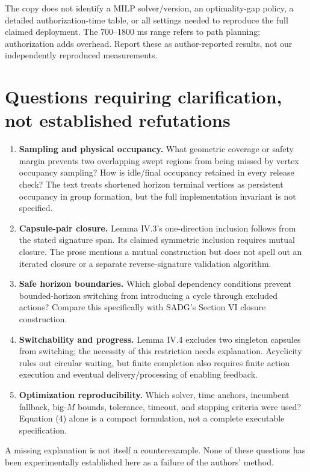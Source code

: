 \documentclass[11pt,a4paper]{article}
\begin{document}
The copy does not identify a MILP solver/version, an optimality-gap policy,
a detailed authorization-time table, or all settings needed to reproduce the
full claimed deployment. The 700--1800 ms range refers to path planning;
authorization adds overhead. Report these as author-reported results, not our
independently reproduced measurements.

\section{Questions requiring clarification, not established refutations}
\begin{enumerate}
\item \textbf{Sampling and physical occupancy.} What geometric coverage or safety
margin prevents two overlapping swept regions from being missed by vertex
occupancy sampling? How is idle/final occupancy retained in every release check?
The text treats shortened horizon terminal vertices as persistent occupancy in
group formation, but the full implementation invariant is not specified.
\item \textbf{Capsule-pair closure.} Lemma IV.3's one-direction inclusion follows
from the stated signature span. Its claimed symmetric inclusion requires mutual
closure. The prose mentions a mutual construction but does not spell out an
iterated closure or a separate reverse-signature validation algorithm.
\item \textbf{Safe horizon boundaries.} Which global dependency conditions prevent
bounded-horizon switching from introducing a cycle through excluded actions?
Compare this specifically with SADG's Section VI closure construction.
\item \textbf{Switchability and progress.} Lemma IV.4 excludes two singleton
capsules from switching; the necessity of this restriction needs explanation.
Acyclicity rules out circular waiting, but finite completion also requires finite
action execution and eventual delivery/processing of enabling feedback.
\item \textbf{Optimization reproducibility.} Which solver, time anchors, incumbent
fallback, big-$M$ bounds, tolerance, timeout, and stopping criteria were used?
Equation (4) alone is a compact formulation, not a complete executable specification.
\end{enumerate}
A missing explanation is not itself a counterexample. None of these questions
has been experimentally established here as a failure of the authors' method.
\end{document}
